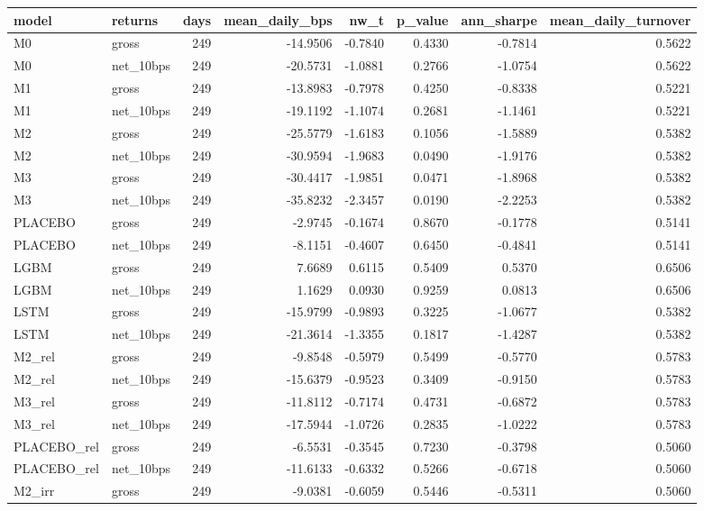 \begin{tabular}{llrrrrrr}
\toprule
model & returns & days & mean\_daily\_bps & nw\_t & p\_value & ann\_sharpe & mean\_daily\_turnover \\
\midrule
M0 & gross & 249 & -14.9506 & -0.7840 & 0.4330 & -0.7814 & 0.5622 \\
M0 & net\_10bps & 249 & -20.5731 & -1.0881 & 0.2766 & -1.0754 & 0.5622 \\
M1 & gross & 249 & -13.8983 & -0.7978 & 0.4250 & -0.8338 & 0.5221 \\
M1 & net\_10bps & 249 & -19.1192 & -1.1074 & 0.2681 & -1.1461 & 0.5221 \\
M2 & gross & 249 & -25.5779 & -1.6183 & 0.1056 & -1.5889 & 0.5382 \\
M2 & net\_10bps & 249 & -30.9594 & -1.9683 & 0.0490 & -1.9176 & 0.5382 \\
M3 & gross & 249 & -30.4417 & -1.9851 & 0.0471 & -1.8968 & 0.5382 \\
M3 & net\_10bps & 249 & -35.8232 & -2.3457 & 0.0190 & -2.2253 & 0.5382 \\
PLACEBO & gross & 249 & -2.9745 & -0.1674 & 0.8670 & -0.1778 & 0.5141 \\
PLACEBO & net\_10bps & 249 & -8.1151 & -0.4607 & 0.6450 & -0.4841 & 0.5141 \\
LGBM & gross & 249 & 7.6689 & 0.6115 & 0.5409 & 0.5370 & 0.6506 \\
LGBM & net\_10bps & 249 & 1.1629 & 0.0930 & 0.9259 & 0.0813 & 0.6506 \\
LSTM & gross & 249 & -15.9799 & -0.9893 & 0.3225 & -1.0677 & 0.5382 \\
LSTM & net\_10bps & 249 & -21.3614 & -1.3355 & 0.1817 & -1.4287 & 0.5382 \\
M2\_rel & gross & 249 & -9.8548 & -0.5979 & 0.5499 & -0.5770 & 0.5783 \\
M2\_rel & net\_10bps & 249 & -15.6379 & -0.9523 & 0.3409 & -0.9150 & 0.5783 \\
M3\_rel & gross & 249 & -11.8112 & -0.7174 & 0.4731 & -0.6872 & 0.5783 \\
M3\_rel & net\_10bps & 249 & -17.5944 & -1.0726 & 0.2835 & -1.0222 & 0.5783 \\
PLACEBO\_rel & gross & 249 & -6.5531 & -0.3545 & 0.7230 & -0.3798 & 0.5060 \\
PLACEBO\_rel & net\_10bps & 249 & -11.6133 & -0.6332 & 0.5266 & -0.6718 & 0.5060 \\
M2\_irr & gross & 249 & -9.0381 & -0.6059 & 0.5446 & -0.5311 & 0.5060 \\

\end{tabular}
